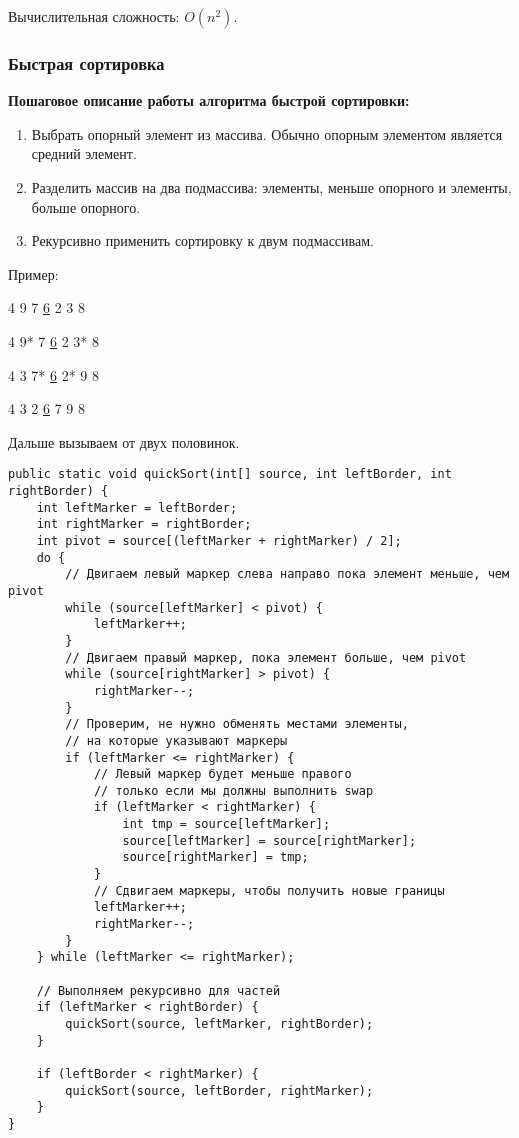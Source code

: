 \documentclass[12pt]{matmex-diploma}
\begin{document}
            Вычислительная сложность: $O(n^2)$.
        
        \subsubsection*{Быстрая сортировка}
        
            \textbf{Пошаговое описание работы алгоритма быстрой сортировки:}
            \begin{enumerate}
                \item Выбрать опорный элемент из массива. Обычно опорным элементом является средний элемент.
                \item Разделить массив на два подмассива: элементы, меньше опорного и элементы, больше опорного.
                \item Рекурсивно применить сортировку к двум подмассивам.
            \end{enumerate}
            
            Пример:
            
            4 9 7  \underline{6} 2 3 8
            
            4 9* 7  \underline{6}  2 3* 8
              
            4 3 7*  \underline{6}  2* 9 8
            
            4 3 2  \underline{6} 7 9 8
                
            Дальше вызываем от двух половинок.    

            \begin{verbatim}
public static void quickSort(int[] source, int leftBorder, int rightBorder) {
    int leftMarker = leftBorder;
    int rightMarker = rightBorder;
    int pivot = source[(leftMarker + rightMarker) / 2];
    do {
        // Двигаем левый маркер слева направо пока элемент меньше, чем pivot
        while (source[leftMarker] < pivot) {
            leftMarker++;
        }
        // Двигаем правый маркер, пока элемент больше, чем pivot
        while (source[rightMarker] > pivot) {
            rightMarker--;
        }
        // Проверим, не нужно обменять местами элементы, 
        // на которые указывают маркеры
        if (leftMarker <= rightMarker) {
            // Левый маркер будет меньше правого 
            // только если мы должны выполнить swap
            if (leftMarker < rightMarker) {
                int tmp = source[leftMarker];
                source[leftMarker] = source[rightMarker];
                source[rightMarker] = tmp;
            }
            // Сдвигаем маркеры, чтобы получить новые границы
            leftMarker++;
            rightMarker--;
        }
    } while (leftMarker <= rightMarker);

    // Выполняем рекурсивно для частей
    if (leftMarker < rightBorder) {
        quickSort(source, leftMarker, rightBorder);
    }
    
    if (leftBorder < rightMarker) {
        quickSort(source, leftBorder, rightMarker);
    }
}
            \end{verbatim}
\end{document}
